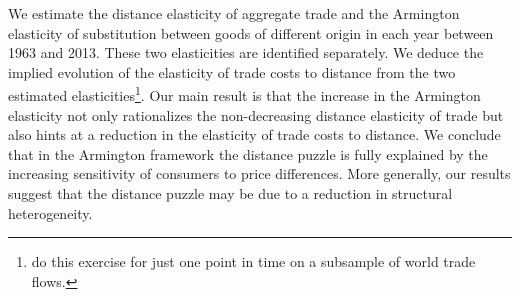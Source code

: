 \documentclass[12pt,twoside,a4paper,notitlepage]{article}
\begin{document}
We estimate the distance elasticity of aggregate trade and the Armington elasticity of substitution between goods of different origin in each year between 1963 and 2013.
These two elasticities are identified separately.
We deduce the implied evolution of the elasticity of trade costs to distance from the two estimated elasticities\footnote{\cite{Erkel-Rousse2002} do this exercise for just one point in time on a subsample of world trade flows.}.
Our main result is that the increase in the Armington elasticity not only rationalizes the non-decreasing distance elasticity of trade but also hints at a reduction in the elasticity of trade costs to distance.
We conclude that in the Armington framework the distance puzzle is fully explained by the increasing sensitivity of consumers to price differences.
More generally, our results suggest that the distance puzzle may be due to a reduction in structural heterogeneity.
\end{document}

